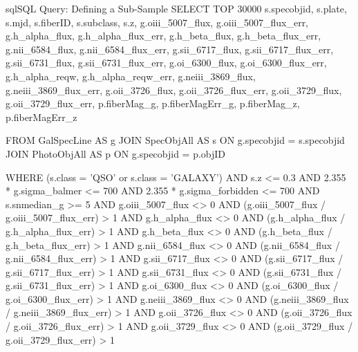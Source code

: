 \documentclass[letterpaper, oneside]{article}
\begin{document}
\begin{sourcecode}[\label{sdss_query_subsample}]{sql}{SQL Query: Defining a Sub-Sample}
SELECT TOP 30000 s.specobjid, s.plate, s.mjd, s.fiberID, 
s.subclass, s.z, 
g.oiii_5007_flux, g.oiii_5007_flux_err, 
g.h_alpha_flux, g.h_alpha_flux_err, 
g.h_beta_flux, g.h_beta_flux_err, 
g.nii_6584_flux, g.nii_6584_flux_err, 
g.sii_6717_flux, g.sii_6717_flux_err, 
g.sii_6731_flux, g.sii_6731_flux_err, 
g.oi_6300_flux, g.oi_6300_flux_err, 
g.h_alpha_reqw, g.h_alpha_reqw_err, 
g.neiii_3869_flux, g.neiii_3869_flux_err, 
g.oii_3726_flux, g.oii_3726_flux_err, 
g.oii_3729_flux, g.oii_3729_flux_err, 
p.fiberMag_g, p.fiberMagErr_g, 
p.fiberMag_z, p.fiberMagErr_z

FROM GalSpecLine AS g 
JOIN SpecObjAll AS s ON g.specobjid = s.specobjid
JOIN PhotoObjAll AS p ON g.specobjid = p.objID

WHERE
(s.class = 'QSO' or s.class = 'GALAXY')
AND s.z <= 0.3
AND 2.355 * g.sigma_balmer <= 700
AND 2.355 * g.sigma_forbidden <= 700
AND s.snmedian_g >= 5
AND g.oiii_5007_flux <> 0
AND (g.oiii_5007_flux / g.oiii_5007_flux_err) > 1
AND g.h_alpha_flux <> 0
AND (g.h_alpha_flux / g.h_alpha_flux_err) > 1
AND g.h_beta_flux <> 0
AND (g.h_beta_flux / g.h_beta_flux_err) > 1
AND g.nii_6584_flux <> 0
AND (g.nii_6584_flux / g.nii_6584_flux_err) > 1
AND g.sii_6717_flux <> 0
AND (g.sii_6717_flux / g.sii_6717_flux_err) > 1
AND g.sii_6731_flux <> 0
AND (g.sii_6731_flux / g.sii_6731_flux_err) > 1
AND g.oi_6300_flux <> 0
AND (g.oi_6300_flux / g.oi_6300_flux_err) > 1
AND g.neiii_3869_flux <> 0
AND (g.neiii_3869_flux / g.neiii_3869_flux_err) > 1
AND g.oii_3726_flux <> 0
AND (g.oii_3726_flux / g.oii_3726_flux_err) > 1
AND g.oii_3729_flux <> 0
AND (g.oii_3729_flux / g.oii_3729_flux_err) > 1
\end{sourcecode}



\end{document}
